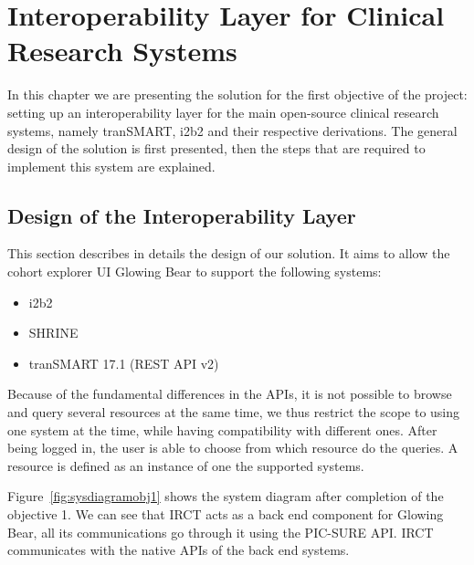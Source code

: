 
\chapter{Interoperability Layer for Clinical Research Systems}

In this chapter we are presenting the solution for the first objective of the project:
setting up an interoperability layer for the main open-source clinical research systems, namely tranSMART, i2b2 and their respective derivations.
The general design of the solution is first presented, then the steps that are required to implement this system are explained.

\section{Design of the Interoperability Layer}

This section describes in details the design of our solution. %
It aims to allow the cohort explorer UI Glowing Bear to support the following systems:
\begin{itemize}
    \item i2b2
    \item SHRINE 
    \item tranSMART 17.1 (REST API v2)
\end{itemize}

Because of the fundamental differences in the APIs, it is not possible to browse and query several resources at the same time, we thus restrict the scope to using one system at the time, while having compatibility with different ones.
After being logged in, the user is able to choose from which resource do the queries.
A resource is defined as an instance of one the supported systems.

Figure~\ref{fig:sysdiagramobj1} shows the system diagram after completion of the objective 1.
We can see that IRCT acts as a back end component for Glowing Bear, all its communications go through it using the PIC-SURE API.
IRCT communicates with the native APIs of the back end systems.

